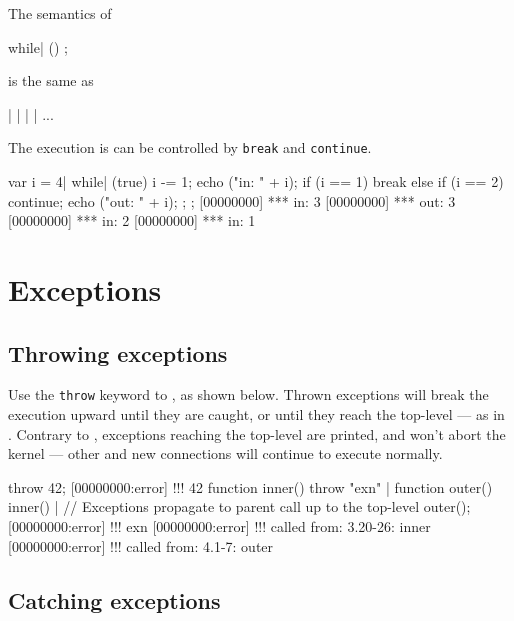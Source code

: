 The semantics of

\begin{urbiunchecked}[frame=, backgroundcolor=, ]
while| ()
  ;
\end{urbiunchecked}

\noindent
is the same as

\begin{urbiunchecked}[frame=, backgroundcolor=, ]
 |  |  |  | ...
\end{urbiunchecked}

The execution is can be controlled by \lstinline|break| and
\lstinline|continue|.

\begin{urbiscript}[firstnumber=last]
{
  var i = 4|
  while| (true)
  {
    i -= 1;
    echo ("in: " + i);
    if (i == 1)
      break
    else if (i == 2)
      continue;
    echo ("out: " + i);
  };
};
[00000000] *** in: 3
[00000000] *** out: 3
[00000000] *** in: 2
[00000000] *** in: 1
\end{urbiscript}


\section{Exceptions}
\label{sec:lang:except}
\subsection{Throwing exceptions}

Use the \lstinline|throw| keyword to , as shown below. Thrown exceptions will
break the execution upward until they are caught, or until they reach
the top-level --- as in \Cxx.  Contrary to \Cxx, exceptions reaching
the top-level are printed, and won't abort the kernel --- other and new
connections will continue to execute normally.

\begin{urbiscript}[firstnumber=last]
throw 42;
[00000000:error] !!! 42
function inner() { throw "exn" } |
function outer() { inner() }|
// Exceptions propagate to parent call up to the top-level
outer();
[00000000:error] !!! exn
[00000000:error] !!!    called from: 3.20-26: inner
[00000000:error] !!!    called from: 4.1-7: outer
\end{urbiscript}

\subsection{Catching exceptions}

